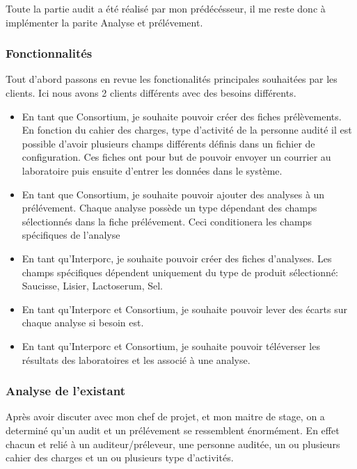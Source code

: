 Toute la partie audit a été réalisé par mon prédécésseur, il me reste donc à implémenter la parite Analyse et prélévement. 

\subsubsection{Fonctionnalités}
Tout d'abord passons en revue les fonctionalités principales souhaitées par les clients. Ici nous avons 2 clients différents avec des besoins différents.
\begin{itemize}
    \item En tant que Consortium, je souhaite pouvoir créer des fiches prélèvements. En fonction du cahier des charges, type d'activité de la personne audité il est possible d'avoir plusieurs champs différents définis dans un fichier de configuration. Ces fiches ont pour but de pouvoir envoyer un courrier au laboratoire puis ensuite d'entrer les données dans le système.
    \item En tant que Consortium, je souhaite pouvoir ajouter des analyses à un prélévement. Chaque analyse possède un type dépendant des champs sélectionnés dans la fiche prélévement. Ceci conditionera les champs spécifiques de l'analyse
    \item En tant qu'Interporc, je souhaite pouvoir créer des fiches d'analyses. Les champs spécifiques dépendent uniquement du type de produit sélectionné: Saucisse, Lisier, Lactoserum, Sel. 
    \item En tant qu'Interporc et Consortium, je souhaite pouvoir lever des écarts sur chaque analyse si besoin est.  
    \item En tant qu'Interporc et Consortium, je souhaite pouvoir téléverser les résultats des laboratoires et les associé à une analyse. 
\end{itemize}



\subsubsection{Analyse de l'existant}


Après avoir discuter avec mon chef de projet, et mon maitre de stage, on a determiné qu'un audit et un prélévement se ressemblent énormément. En effet chacun et relié à un auditeur/préleveur, une personne auditée, un ou plusieurs cahier des charges et un ou plusieurs type d'activités. 

